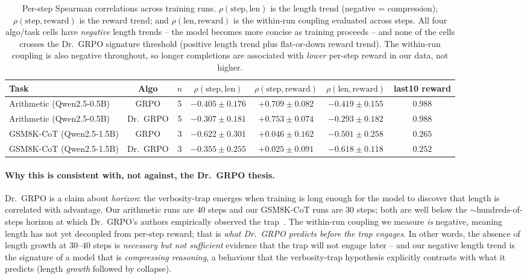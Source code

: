 \documentclass{article}
\begin{document}
\begin{table}[htbp]
\centering
\small
\begin{tabular}{lcccccc}
\toprule
Task & Algo & $n$ & $\rho(\text{step},\text{len})$
   & $\rho(\text{step},\text{reward})$ & $\rho(\text{len},\text{reward})$
   & last10 reward \\
\midrule
Arithmetic (Qwen2.5-0.5B)   & GRPO     & 5 & $-0.405 \pm 0.176$ & $+0.709 \pm 0.082$ & $-0.419 \pm 0.155$ & $0.988$ \\
Arithmetic (Qwen2.5-0.5B)   & Dr.~GRPO & 5 & $-0.307 \pm 0.181$ & $+0.753 \pm 0.074$ & $-0.293 \pm 0.182$ & $0.988$ \\
GSM8K-CoT (Qwen2.5-1.5B)    & GRPO     & 3 & $-0.622 \pm 0.301$ & $+0.046 \pm 0.162$ & $-0.501 \pm 0.258$ & $0.265$ \\
GSM8K-CoT (Qwen2.5-1.5B)    & Dr.~GRPO & 3 & $-0.355 \pm 0.255$ & $+0.025 \pm 0.091$ & $-0.618 \pm 0.118$ & $0.252$ \\
\bottomrule
\end{tabular}
\caption{Per-step Spearman correlations across training runs. $\rho(\text{step},\text{len})$ is the
length trend (negative = compression); $\rho(\text{step},\text{reward})$ is the reward trend; and
$\rho(\text{len},\text{reward})$ is the within-run coupling evaluated across steps. All four
algo/task cells have \emph{negative} length trends -- the model becomes more concise as training
proceeds -- and none of the cells crosses the Dr.~GRPO signature threshold (positive length trend
plus flat-or-down reward trend). The within-run coupling is also negative throughout, so longer
completions are associated with \emph{lower} per-step reward in our data, not higher.}
\label{tab:length-bias-summary}
\end{table}

\paragraph{Why this is consistent with, not against, the Dr.~GRPO thesis.}
Dr.~GRPO is a claim about \emph{horizon}: the verbosity-trap emerges
when training is long enough for the model to discover that length
is correlated with advantage. Our arithmetic runs are $40$ steps
and our GSM8K-CoT runs are $30$ steps; both are well below the
$\sim$hundreds-of-steps horizon at which Dr.~GRPO's authors
empirically observed the trap~\cite{tong2025drgrpo}. The
within-run coupling we measure \emph{is} negative, meaning
length has not yet decoupled from per-step reward; that is
\emph{what Dr.~GRPO predicts before the trap engages}. In other
words, the absence of length growth at $30$--$40$ steps is
\emph{necessary but not sufficient} evidence that the trap will
not engage later -- and our negative length trend is the signature
of a model that is \emph{compressing reasoning}, a behaviour that
the verbosity-trap hypothesis explicitly contrasts with what it
predicts (length \emph{growth} followed by collapse).
\end{document}
